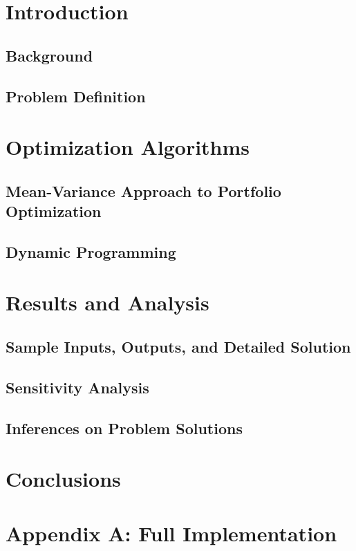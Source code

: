 \documentclass[12pt]{article}
\begin{document}


\dotableofcontents

\newpage
\doublespacing
{}
\section{Introduction}
\setlength{\parindent}{1cm}
\subsection{Background}

\subsection{Problem Definition}


\newpage
\section{Optimization Algorithms}
\subsection{Mean-Variance Approach to Portfolio Optimization}

\subsection{Dynamic Programming}

\section{Results and Analysis}
\subsection{Sample Inputs, Outputs, and Detailed Solution}


\subsection{Sensitivity Analysis}


\subsection{Inferences on Problem Solutions}

\newpage
\section{Conclusions}


\newpage
\section{Appendix A: Full Implementation}
\end{document}
